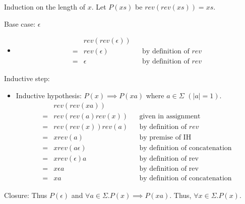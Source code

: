 \documentclass{article}
\begin{document}
\section{}
Induction on the length of $x$. Let $P(xs)$ be $rev(rev(xs)) = xs$.

Base case: $\epsilon$
\begin{itemize}
\item
\begin{align*}
& rev(rev(\epsilon)) && \\
= &rev(\epsilon) && \text{by definition of $rev$} \\
= &\epsilon && \text{by definition of $rev$}
\end{align*}
\end{itemize}
Inductive step:
\begin{itemize}
\item Inductive hypothesis: $P(x) \implies P(xa)$ where $a \in \Sigma$ $(|a| = 1)$.
\begin{align*}
&rev(rev(xa)) && \\
=&rev(rev(a)rev(x)) && \text{given in assignment} \\
=&rev(rev(x))rev(a) && \text{by definition of $rev$} \\
=&x rev(a) && \text{by premise of IH} \\
=&x rev(a\epsilon) &&  \text{by definition of concatenation} \\
=&x rev(\epsilon) a && \text{by definition of rev} \\
=&x \epsilon a && \text{by definition of rev} \\
=&xa && \text{by definition of concatenation}
\end{align*}
\end{itemize}
Closure: Thus $P(\epsilon)$ and $\forall a \in \Sigma.P(x) \implies P(xa)$. Thus, $\forall x \in \Sigma.P(x)$.
\end{document}
